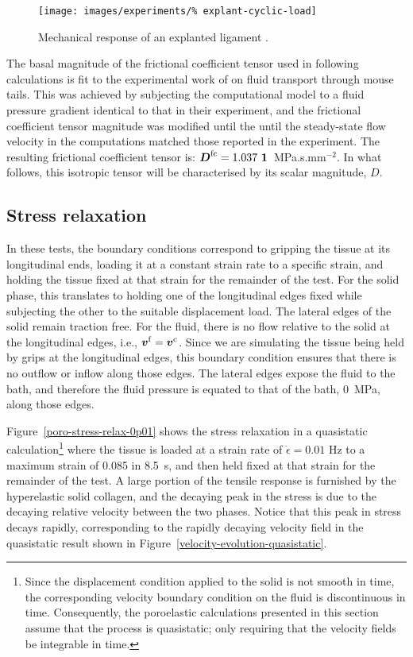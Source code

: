 \begin{figure}[!hptb]
  \centering
  \texttt{[image: images/experiments/\%
    explant-cyclic-load]}
  \caption{Mechanical response of an explanted ligament
    \citep{ma:07}.}
  \label{explanted-ligament}
\end{figure}

The basal magnitude of the frictional coefficient tensor used in
following calculations is fit to the experimental work of
\citet{Swartzetal:99} on fluid transport through mouse tails. This was
achieved by subjecting the computational model to a fluid pressure
gradient identical to that in their experiment, and the frictional
coefficient tensor magnitude was modified until the until the
steady-state flow velocity in the computations matched those reported
in the experiment. The resulting frictional coefficient tensor is:
$\bD^{\mathrm{fc}} = 1.037 \ \bone$~MPa.s.mm$^{-2}$. In what follows,
this isotropic tensor will be characterised by its scalar magnitude,
$D$.

\subsection{Stress relaxation}
\label{stress-relaxation}

In these tests, the boundary conditions correspond to gripping the
tissue at its longitudinal ends, loading it at a constant strain rate
to a specific strain, and holding the tissue fixed at that strain for
the remainder of the test. For the solid phase, this translates to
holding one of the longitudinal edges fixed while subjecting the other
to the suitable displacement load. The lateral edges of the solid
remain traction free. For the fluid, there is no flow relative to the
solid at the longitudinal edges, i.e., $\mbox{\boldmath$ v$}^{\mathrm{f}} = \mbox{\boldmath$ v$} ^
{\mathrm{c}}$. Since we are simulating the tissue being held by grips
at the longitudinal edges, this boundary condition ensures that there
is no outflow or inflow along those edges. The lateral edges expose
the fluid to the bath, and therefore the fluid pressure is equated to
that of the bath, 0~MPa, along those edges.

Figure~\ref{poro-stress-relax-0p01} shows the stress relaxation in a
quasistatic calculation\footnote{Since the displacement condition
  applied to the solid is not smooth in time, the corresponding
  velocity boundary condition on the fluid is discontinuous in
  time. Consequently, the poroelastic calculations presented in this
  section assume that the process is quasistatic; only requiring that
  the velocity fields be integrable in time.}  where the tissue is
loaded at a strain rate of $\dot{\epsilon}=0.01$ Hz to a maximum
strain of 0.085 in 8.5~s, and then held fixed at that strain for the
remainder of the test. A large portion of the tensile response is
furnished by the hyperelastic solid collagen, and the decaying peak in
the stress is due to the decaying relative velocity between the two
phases. Notice that this peak in stress decays rapidly, corresponding
to the rapidly decaying velocity field in the quasistatic result shown
in Figure~\ref{velocity-evolution-quasistatic}.

